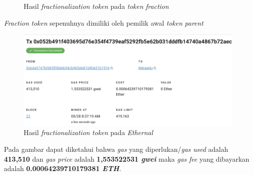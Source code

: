 \begin{itemize}
\begin{figure} [H]
          \caption{Hasil \emph{fractionalization} \emph{token} pada \emph{token} \emph{fraction}}
          \label{fig:TestShareResultFractionalizationTokenOnFraction2}
        \end{figure}
        \emph{Fraction} \emph{token} sepenuhnya dimiliki oleh pemilik awal \emph{token} \emph{parent}
        \begin{figure} [H] \centering
          \includegraphics[scale=0.3]{gambar/img-test-share-fraction-7.png}
          \caption{Hasil \emph{fractionalization} \emph{token} pada \emph{Ethernal}}
          \label{fig:TestShareResultFractionalizationTokenOnEthernal}
        \end{figure}
        Pada gambar dapat diketahui bahwa \emph{gas} yang diperlukan/\emph{gas used} adalah \textbf{413,510} dan \emph{gas price} adalah \textbf{1,553522531 \emph{gwei}} maka \emph{gas fee} yang dibayarkan adalah \textbf{0.00064239710179381 \emph{ETH}}.


\end{itemize}
